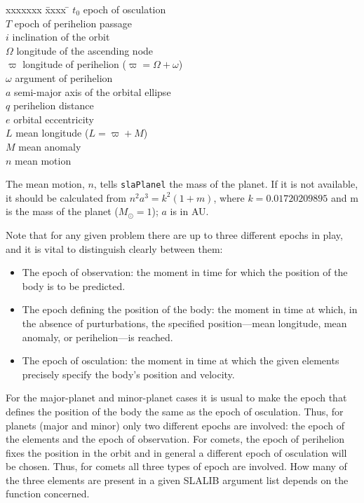 \documentclass[11pt,fleqn,twoside]{article}
\renewcommand{\_}{{\tt\char'137}}     %
\begin{document}
\vspace{-1ex}
\begin{tabbing}
xxxxxxx \= xxxx \= \kill
\> $t_0$ \> epoch of osculation \\
\> $T$ \> epoch of perihelion passage \\
\> $i$ \> inclination of the orbit \\
\> $\Omega$ \> longitude of the ascending node \\
\> $\varpi$ \> longitude of perihelion ($\varpi = \Omega + \omega$) \\
\> $\omega$ \> argument of perihelion \\
\> $a$ \> semi-major axis of the orbital ellipse \\
\> $q$ \> perihelion distance \\
\> $e$ \> orbital eccentricity \\
\> $L$ \> mean longitude ($L = \varpi + M$) \\
\> $M$ \> mean anomaly \\
\> $n$ \> mean motion \\
\end{tabbing}
 
The mean motion, $n$, tells
{\tt slaPlanel} the mass of the planet.
If it is not available, it should be calculated
from $n^2 a^3 = k^2 (1+m)$, where $k = 0.01720209895$ and
m is the mass of the planet ($M_\odot = 1$); $a$ is in AU.
 
Note that for any given problem there are up to three different
epochs in play, and it is vital to distinguish clearly between
them:
\begin{itemize}
\item The epoch of observation:  the moment in time for which the
      position of the body is to be predicted.
\item The epoch defining the position of the body:  the moment in time
      at which, in the absence of purturbations, the specified
      position---mean longitude, mean anomaly, or perihelion---is
      reached.
\item The epoch of osculation:  the moment in time at which the given
      elements precisely specify the body's position and velocity.
\end{itemize}
 
For the major-planet and minor-planet cases it is usual to make
the epoch that defines the position of the body the same as the
epoch of osculation.  Thus, for planets (major and
minor) only two different epochs are
involved:  the epoch of the elements and the epoch of observation.
For comets, the epoch of perihelion fixes the position in the
orbit and in general a different epoch of osculation will be
chosen.  Thus, for comets all three types of epoch are involved.
How many of the three elements are present in a given SLALIB
argument list depends on the function concerned.
 
\end{document}
